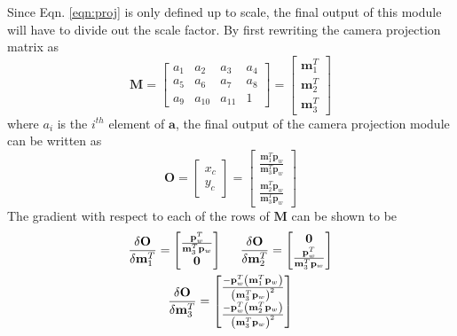 \documentclass[10pt,twocolumn,letterpaper]{article}
\begin{document}
Since Eqn. \ref{eqn:proj} is only defined up to scale, the final output of this module will have to divide out the scale factor. By first rewriting the camera projection matrix as
\begin{equation}
\mathbf{M}=\begin{bmatrix}a_1 & a_2 & a_3 & a_4\\a_5 & a_6 & a_7 & a_8\\a_9 & a_{10} & a_{11} & 1\end{bmatrix}=\begin{bmatrix}\mathbf{m}_1^T\\\mathbf{m}_2^T\\\mathbf{m}_3^T\end{bmatrix}
\end{equation}
where $a_i$ is the $i^{th}$ element of $\mathbf{a}$, the final output of the camera projection module can be written as
\begin{equation}
\mathbf{O}=\begin{bmatrix}x_c\\y_c\end{bmatrix}=\begin{bmatrix}\frac{\mathbf{m}_1^T\mathbf{p}_w}{\mathbf{m}_3^T\mathbf{p}_w}\\
\frac{\mathbf{m}_2^T\mathbf{p}_w}{\mathbf{m}_3^T\mathbf{p}_w}\end{bmatrix}
\label{eqn:proj_output}
\end{equation}
The gradient with respect to each of the rows of $\mathbf{M}$ can be shown to be
\begin{gather}
\frac{\delta\mathbf{O}}{\delta\mathbf{m}_1^T}=\begin{bmatrix}\frac{\mathbf{p}_w^T}{\mathbf{m}_3^T\mathbf{p}_w}\\\mathbf{0}\end{bmatrix} \hspace{.2in} \frac{\delta\mathbf{O}}{\delta\mathbf{m}_2^T}=\begin{bmatrix}\mathbf{0}\\\frac{\mathbf{p}_w^T}{\mathbf{m}_3^T\mathbf{p}_w}\end{bmatrix} \nonumber\\
\frac{\delta\mathbf{O}}{\delta\mathbf{m}_3^T}=\begin{bmatrix}\frac{-\mathbf{p}_w^T\left(\mathbf{m}_1^T\mathbf{p}_w\right)}{\left(\mathbf{m}_3^T\mathbf{p}_w\right)^2}\\\frac{-\mathbf{p}_w^T\left(\mathbf{m}_2^T\mathbf{p}_w\right)}{\left(\mathbf{m}_3^T\mathbf{p}_w\right)^2}\end{bmatrix}
\end{gather}
\end{document}
